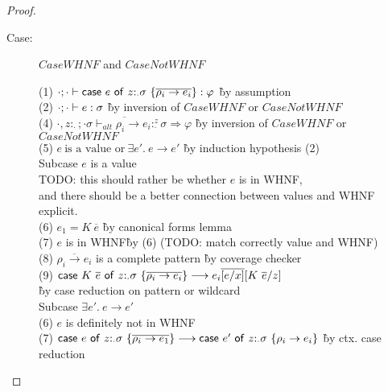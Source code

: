 \begin{proof}
\begin{description}
\item[Case:] $CaseWHNF$ and $CaseNotWHNF$
\begin{tabbing}
    (1) $\cdot; \cdot \vdash \mathsf{case}~e~\mathsf{of}~z{:}_{\cdot}\sigma~\{\overline{\rho_i \to e_i}\} : \varphi$ \` by assumption \\
    (2) $\cdot; \cdot \vdash e : \sigma$ \` by inversion of $CaseWHNF$ or $CaseNotWHNF$\\
    (4) $\overline{\cdot, z{:}_{\cdot}; \cdot \sigma \vdash_{alt} \rho_i\to e_i :^z_\cdot \sigma \Rightarrow \varphi}$ \` by inversion of $CaseWHNF$ or $CaseNotWHNF$\\
    (5) $e~\textrm{is a value or}~\exists e'.~e \longrightarrow e'$ \` by induction hypothesis (2) \\
    Subcase $e$ is a value\\
    TODO: this should rather be whether $e$ is in WHNF,\\
    and there should be a better connection between values and WHNF explicit.\\
    (6) $e_1 = K~\overline{e}$ \` by canonical forms lemma \\
    (7) $e$ is in WHNF\` by (6) (TODO: match correctly value and WHNF)\\
    (8) $\overline{\rho_i \to e_i}$ is a complete pattern \` by coverage checker\\
    (9) $\mathsf{case}~K~\overline{e}~\mathsf{of}~z{:}_{\cdot}\sigma~\{\overline{\rho_i \to e_i}\} \longrightarrow e_i\overline{[e/x]}[K~\overline{e}/z]$\\\` by case reduction on pattern or wildcard\\
    Subcase $\exists e'.~e \longrightarrow e'$\\
    (6) $e$ is definitely not in WHNF\\
    (7) $\mathsf{case}~e~\mathsf{of}~z{:}_{\cdot}\sigma~\{\overline{\rho_i \to e_1}\} \longrightarrow \mathsf{case}~e'~\mathsf{of}~z{:}_{\cdot}\sigma~\{\rho_i \to e_i\}$ \` by ctx. case reduction\\
\end{tabbing}

\end{description}

\end{proof}

